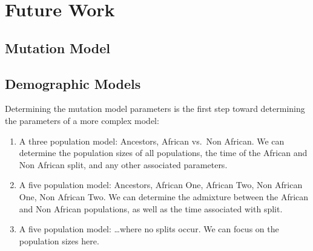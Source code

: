 \section{Future Work}\label{sec:fw}

\subsection{Mutation Model}\label{subsec:mm}

\subsection{Demographic Models}\label{subsec:dm}

Determining the mutation model parameters is the first step toward determining the parameters of a more complex model:
\begin{enumerate}
    \item A three population model: Ancestors, African vs.\ Non African.
        We can determine the population sizes of all populations, the time of the African and Non African split, and
        any other associated parameters.
    \item A five population model: Ancestors, African One, African Two, Non African One, Non African Two.
        We can determine the admixture between the African and Non African populations, as well as the time associated
        with split.
    \item A five population model: \ldots where no splits occur.
        We can focus on the population sizes here.
\end{enumerate}